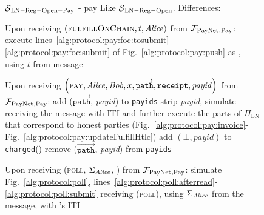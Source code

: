 \begin{figure}[H]
  \begin{simulatorbox}{$\mathcal{S}{}_{\mathrm{LN - Reg - Open - Pay}}$ - pay}
    Like $\mathcal{S}{}_{\mathrm{LN - Reg - Open}}$. Differences:
    \begin{algorithmic}[1]
      \State Upon receiving $\left(\textsc{fulfillOnChain}, t, \mathit{Alice}\right)$
      from $\mathcal{F}_{\mathrm{PayNet}}{}_{\mathrm{, Pay}}$:
      \label{alg:sim:pay:foc:top}
      \Indent
        \State execute
        lines~\ref{alg:protocol:pay:foc:tosubmit}-\ref{alg:protocol:pay:foc:submit}
        of Fig.~\ref{alg:protocol:pay:push} as \alice{}, using $t$ from message
        \label{alg:sim:pay:foc:run}
      \EndIndent
      \Statex

      \State Upon receiving $\left(\textsc{pay}, \mathit{Alice}, \mathit{Bob}, x,
      \overrightarrow{\mathtt{path}}, \mathtt{receipt}, \mathit{payid}\right)$
      from $\mathcal{F}_{\mathrm{PayNet}}{}_{\mathrm{, Pay}}$:
      \Indent
        \State add ($\overrightarrow{\mathtt{path}}$, \textit{payid}) to
        \texttt{payids}
        \State strip \textit{payid}, simulate receiving the message with
        \alice{} ITI and further execute the parts of $\Pi_{\mathrm{LN}}$ that
        correspond to honest parties (Fig.~\ref{alg:protocol:pay:invoice}-
        Fig.~\ref{alg:protocol:pay:updateFulfillHtlc})
        \label{alg:sim:pay:simulate}
         
          \State add $\left(\bot, \mathit{payid}\right)$ to
          \texttt{charged}(\alice)
          \State remove ($\overrightarrow{\mathtt{path}}$, \textit{payid}) from
          \texttt{payids}
        \EndIf
      \EndIndent
      \Statex

      \State Upon receiving (\textsc{poll}, $\Sigma_{\mathit{Alice}}$, \alice) from
      $\mathcal{F}_{\mathrm{PayNet}}{}_{\mathrm{, Pay}}$:
      \Indent
        \State simulate Fig.~\ref{alg:protocol:poll},
        lines~\ref{alg:protocol:poll:afterread}-\ref{alg:protocol:poll:submit}
        receiving (\textsc{poll}), using $\Sigma_{\mathit{Alice}}$ from the message,
        with \alice's ITI
        \label{alg:sim:poll:run}
      \EndIndent
    \end{algorithmic}
  \end{simulatorbox}
  \caption{}
  \label{alg:sim:pay}
\end{figure}

